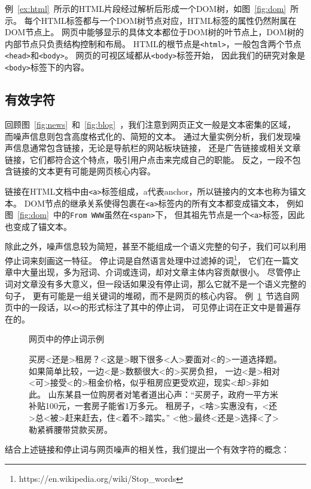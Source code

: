例~\ref{ex:html}~所示的HTML片段经过解析后形成一个DOM树，如图~\ref{fig:dom}~所示。
每个HTML标签都与一个DOM树节点对应，HTML标签的属性仍然附属在DOM节点上。
网页中能够显示的具体文本都位于DOM树的叶节点上，DOM树的内部节点只负责结构控制和布局。
HTML的根节点是\texttt{<html>}，一般包含两个节点\texttt{<head>}和\texttt{<body>}。
网页的可视区域都从\texttt{<body>}标签开始，
因此我们的研究对象是\texttt{<body>}标签下的内容。

\subsection{有效字符}
回顾图~\ref{fig:news}~和~\ref{fig:blog}~，我们注意到网页正文一般是文本密集的区域，
而噪声信息则包含高度格式化的、简短的文本。
通过大量实例分析，我们发现噪声信息通常包含链接，无论是导航栏的网站板块链接，
还是广告链接或相关文章链接，它们都符合这个特点，吸引用户点击来完成自己的职能。
反之，一段不包含链接的文本更有可能是网页核心内容。

链接在HTML文档中由\texttt{<a>}标签组成，a代表anchor，所以链接内的文本也称为锚文本。
DOM节点的继承关系使得包裹在\texttt{<a>}标签内的所有文本都变成锚文本，
例如图~\ref{fig:dom}~中的\texttt{From WWW}虽然在\texttt{<span>}下，
但其祖先节点是一个\texttt{<a>}标签，因此也变成了锚文本。

除此之外，噪声信息较为简短，甚至不能组成一个语义完整的句子，我们可以利用停止词来刻画这一特征。
停止词是自然语言处理中过滤掉的词\footnote{https://en.wikipedia.org/wiki/Stop\_words}，
它们在一篇文章中大量出现，多为冠词、介词或连词，却对文章主体内容贡献很小。
尽管停止词对文章没有多大意义，但一段话如果没有停止词，那么它就不是一个语义完整的句子，
更有可能是一组关键词的堆砌，而不是网页的核心内容。
例~\ref{ex:stopwords}~节选自网页中的一段话，以\texttt{<>}的形式标注了其中的停止词，
可见停止词在正文中是普遍存在的。

\begin{figure}[htbp]
\begin{example}
\label{ex:stopwords}
网页中的停止词示例
\end{example}
买房<还是>租房？<这是>眼下很多<人>要面对<的>一道选择题。
如果简单比较，一边<是>数额很大<的>买房负担，
一边<是>相对<可>接受<的>租金价格，似乎租房应更受欢迎，现实<却>非如此。
山东某县一位购房者对笔者道出心声：“买房子，政府一平方米补贴100元，一套房子能省1万多元。
租房子，<啥>实惠没有，<还>总<被>赶来赶去，住<着不>踏实。”
<他>最终<还是>选择<了>勒紧裤腰带贷款买房。
\end{figure}

结合上述链接和停止词与网页噪声的相关性，我们提出一个有效字符的概念：

